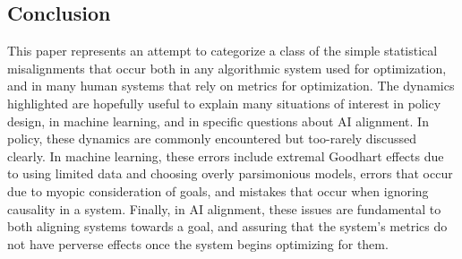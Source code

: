 \documentclass[10pt]{article}
\begin{document}
\subsection*{Conclusion}
This paper represents an attempt to categorize a class of the simple statistical misalignments that occur both in any algorithmic system used for optimization, and in many human systems that rely on metrics for optimization. The dynamics highlighted are hopefully useful to explain many situations of interest in policy design, in machine learning, and in specific questions about AI alignment. In policy, these dynamics are commonly encountered but too-rarely discussed clearly. In machine learning, these errors include extremal Goodhart effects due to using limited data and choosing overly parsimonious models, errors that occur due to myopic consideration of goals, and mistakes that occur when ignoring causality in a system. Finally, in AI alignment, these issues are fundamental to both aligning systems towards a goal, and assuring that the system's metrics do not have perverse effects once the system begins optimizing for them.




\end{document}
